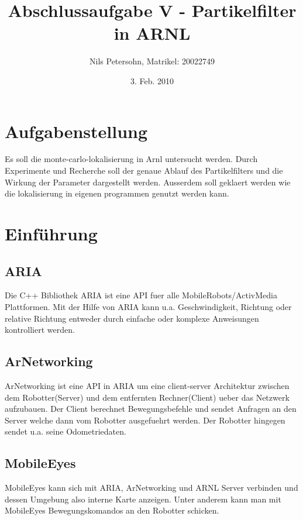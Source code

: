 \documentclass{article}
\title{Abschlussaufgabe V - Partikelfilter in ARNL}
\author{Nils Petersohn, Matrikel: 20022749}
\date{3. Feb. 2010}
\begin{document}
\maketitle

\tableofcontents
\listoftables

\section{Aufgabenstellung}
Es soll die monte-carlo-lokalisierung in Arnl untersucht werden. Durch Experimente und Recherche soll der genaue Ablauf des Partikelfilters und die Wirkung der Parameter dargestellt werden. Ausserdem soll geklaert werden wie die lokalisierung in eigenen programmen genutzt werden kann.


\section{Einf\"uhrung}\label{einfuehrung}



\subsection{ARIA}
Die C++ Bibliothek ARIA ist eine API fuer alle MobileRobots/ActivMedia Plattformen. Mit der Hilfe von ARIA kann u.a. Geschwindigkeit, Richtung oder relative Richtung entweder durch einfache oder komplexe Anweisungen kontrolliert werden.



\subsection{ArNetworking}

ArNetworking ist eine API in ARIA um eine client-server Architektur zwischen dem Robotter(Server) und dem entfernten Rechner(Client) ueber das Netzwerk aufzubauen. Der Client berechnet Bewegungsbefehle und sendet Anfragen an den Server welche dann vom Robotter ausgefuehrt werden. Der Robotter hingegen sendet u.a. seine Odometriedaten. 


\subsection{MobileEyes}
MobileEyes kann sich mit ARIA, ArNetworking und ARNL Server verbinden und dessen Umgebung also interne Karte anzeigen.
Unter anderem kann man mit MobileEyes Bewegungskomandos an den Robotter schicken.\cite{whitbrook1}
\end{document}
